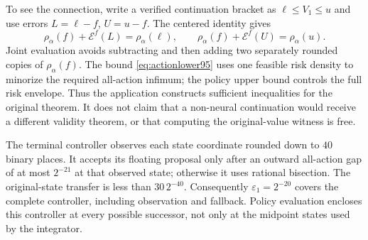 To see the connection, write a verified continuation bracket as $\ell\leq V_1\leq u$ and use errors $L=\ell-f$, $U=u-f$. The centered identity gives
\[
 \rho_\alpha(f)+\mathcal E^f(L)=\rho_\alpha(\ell),\qquad
 \rho_\alpha(f)+\mathcal E^f(U)=\rho_\alpha(u).
\]
Joint evaluation avoids subtracting and then adding two separately rounded copies of $\rho_\alpha(f)$. The bound \eqref{eq:actionlower95} uses one feasible risk density to minorize the required all-action infimum; the policy upper bound controls the full risk envelope. Thus the application constructs sufficient inequalities for the original theorem. It does not claim that a non-neural continuation would receive a different validity theorem, or that computing the original-value witness is free.

The terminal controller observes each state coordinate rounded down to $40$ binary places. It accepts its floating proposal only after an outward all-action gap of at most $2^{-21}$ at that observed state; otherwise it uses rational bisection. The original-state transfer is less than $30\,2^{-40}$. Consequently $\varepsilon_1=2^{-20}$ covers the complete controller, including observation and fallback. Policy evaluation encloses this controller at every possible successor, not only at the midpoint states used by the integrator.

